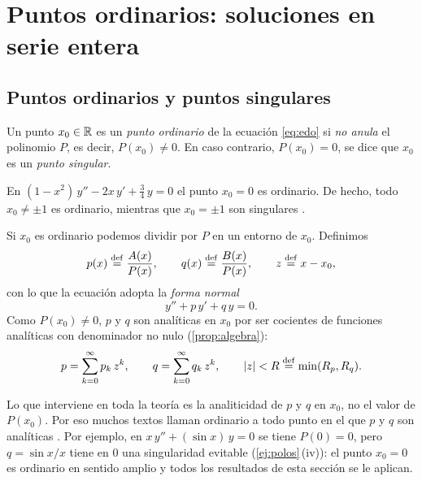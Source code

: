 \section{Puntos ordinarios: soluciones en serie entera}\label{sec:ordinarios}

\subsection{Puntos ordinarios y puntos singulares}\label{sec:def-ordinario}

\begin{definicion}\label{def:ordinario}
Un punto $x_0\in\mathbb{R}$ es un \emph{punto ordinario} de la ecuación
\eqref{eq:edo} si \emph{no anula} el polinomio $P$, es decir,
$P(x_0)\neq0$. En caso contrario, $P(x_0)=0$, se dice que $x_0$ es un
\emph{punto singular}.
\end{definicion}

\begin{ejemplo}\label{ej:ordinario}
En $(1-x^{2})\,y''-2x\,y'+\tfrac34\,y=0$ el punto $x_0=0$ es ordinario. De
hecho, todo $x_0\neq\pm1$ es ordinario, mientras que $x_0=\pm1$ son
singulares \cite{TEMAV}.
\end{ejemplo}

Si $x_0$ es ordinario podemos dividir por $P$ en un entorno de $x_0$.
Definimos
\begin{equation}\label{eq:pq}
  p(x)\mathrel{\overset{\mathrm{def}}{=}}\frac{A(x)}{P(x)},\qquad
  q(x)\mathrel{\overset{\mathrm{def}}{=}}\frac{B(x)}{P(x)},\qquad
  z\mathrel{\overset{\mathrm{def}}{=}} x-x_0 ,
\end{equation}
con lo que la ecuación adopta la \emph{forma normal}
\begin{equation}\label{eq:normal}
  y''+p\,y'+q\,y=0 .
\end{equation}
Como $P(x_0)\neq0$, $p$ y $q$ son analíticas en $x_0$ por ser cocientes de
funciones analíticas con denominador no nulo (\cref{prop:algebra}):
\begin{equation}\label{eq:pq-serie}
  p=\sum_{k=0}^{\infty}p_k\,z^{k},\qquad
  q=\sum_{k=0}^{\infty}q_k\,z^{k},\qquad \lvert z\rvert<R\mathrel{\overset{\mathrm{def}}{=}}\min(R_p,R_q).
\end{equation}

\begin{observacion}\label{obs:ordinario-general}
Lo que interviene en toda la teoría es la analiticidad de $p$ y $q$ en
$x_0$, no el valor de $P(x_0)$. Por eso muchos textos llaman ordinario a
todo punto en el que $p$ y $q$ son analíticas \cite[§5.2]{BOYCE}. Por
ejemplo, en $x\,y''+(\sin x)\,y=0$ se tiene $P(0)=0$, pero
$q=\sin x/x$ tiene en $0$ una singularidad evitable
(\cref{ej:polos}\,(iv)): el punto $x_0=0$ es ordinario en sentido amplio y
todos los resultados de esta sección se le aplican.
\end{observacion}

